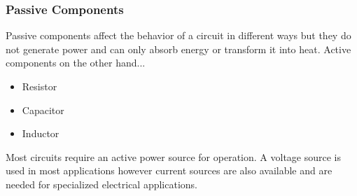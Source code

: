 \documentclass[fleqn]{beamer} %
\newcommand{\sectionIsubsectionItitle}{Passive Components}
\begin{document}
			\begin{frame}
				\frametitle{\sectionIsubsectionItitle}
				
				Passive components affect the behavior of a circuit in different ways but they do   not generate power and can only absorb energy or transform it into heat. Active components on the other hand...

				\begin{itemize}
				\item Resistor 
				\item Capacitor
				\item Inductor
				\end{itemize}

				Most circuits require an active power source for operation. A voltage source is used in most applications however current sources are also available and are needed for specialized electrical applications. 

			\end{frame}
\end{document}
